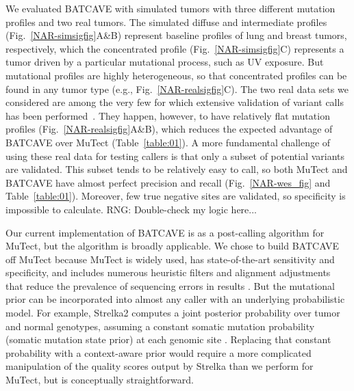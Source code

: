 \documentclass[a4,center,fleqn]{NAR}
\newcommand{\rngcomment}[1]{{\color{red}RNG: #1}}
\newcommand{\batcave}{BATCAVE\xspace}
\begin{document}
We evaluated \batcave with simulated tumors with three different mutation profiles and two real tumors.
The simulated diffuse and intermediate profiles (Fig.~\ref{NAR-simsigfig}A\&B) represent baseline profiles of lung and breast tumors, respectively, which the concentrated profile (Fig.~\ref{NAR-simsigfig}C) represents a tumor driven by a particular mutational process, such as UV exposure.
But mutational profiles are highly heterogeneous, so that concentrated profiles can be found in any tumor type (e.g., Fig.~\ref{NAR-realsigfig}C).
The two real data sets we considered are among the very few for which extensive validation of variant calls has been performed~\cite{Griffith2015, Shi2018}.
They happen, however, to have relatively flat mutation profiles (Fig.~\ref{NAR-realsigfig}A\&B), which reduces the expected advantage of \batcave over MuTect (Table~\ref{table:01}).
A more fundamental challenge of using these real data for testing callers is that only a subset of potential variants are validated.
This subset tends to be relatively easy to call, so both MuTect and \batcave have almost perfect precision and recall (Fig.~\ref{NAR-wes_fig} and Table~\ref{table:01}).
Moreover, few true negative sites are validated, so specificity is impossible to calculate. \rngcomment{Double-check my logic here...}


Our current implementation of \batcave is as a post-calling algorithm for MuTect, but the algorithm is broadly applicable.
We chose to build \batcave off MuTect because MuTect is widely used, has state-of-the-art sensitivity and specificity, and includes numerous heuristic filters and alignment adjustments that reduce the prevalence of sequencing errors in results \cite{Cibulskis2013,Griffith2015}.
But the mutational prior can be incorporated into almost any caller with an underlying probabilistic model.
For example, Strelka2 computes a joint posterior probability over tumor and normal genotypes, assuming a constant somatic mutation probability (somatic mutation state prior) at each genomic site \cite{Kim2018}.
Replacing that constant probability with a context-aware prior would require a more complicated manipulation of the quality scores output by Strelka than we perform for MuTect, but is conceptually straightforward.
\end{document}
